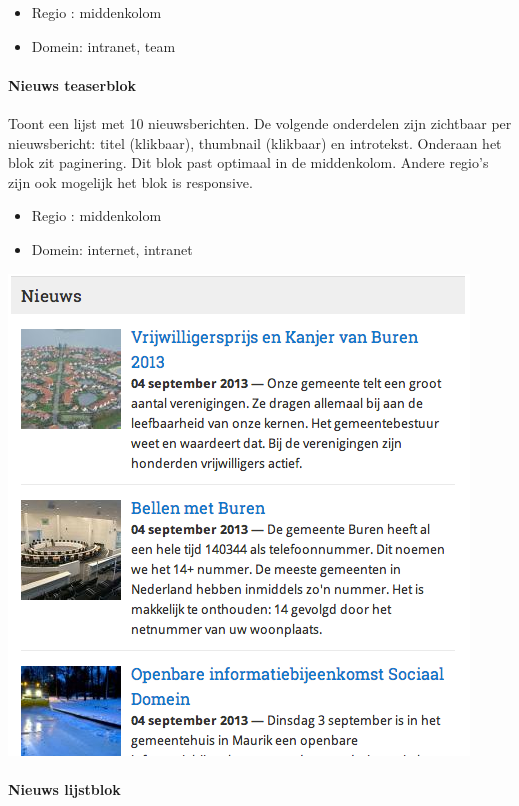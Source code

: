 \begin{itemize}
\item Regio : middenkolom
\item Domein: intranet, team
\end{itemize}

\paragraph{Nieuws teaserblok}

Toont een lijst met 10 nieuwsberichten. De volgende onderdelen zijn zichtbaar per nieuwsbericht: titel (klikbaar), thumbnail (klikbaar) en introtekst. Onderaan het blok zit paginering. Dit blok past optimaal in de middenkolom. Andere regio's zijn ook mogelijk het blok is responsive.

\begin{itemize}
\item Regio : middenkolom
\item Domein: internet, intranet
\end{itemize}

\begin{center}
	\includegraphics[scale=0.5]{img/blokken/nieuwsteaser.png}
\end{center}

\paragraph{Nieuws lijstblok}

